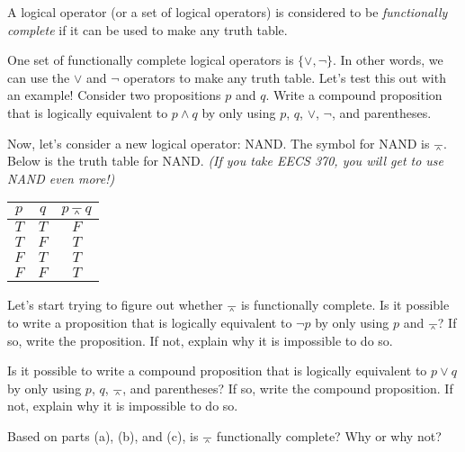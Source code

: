 \documentclass[12pt]{exam}
\begin{document}
A logical operator (or a set of logical operators) is considered to be \textit{functionally complete} if it can be used to make any truth table.
\begin{qparts}
    \item One set of functionally complete logical operators is $\{ \lor, \neg \}$. In other words, we can use the $\lor$ and $\neg$ operators to make any truth table. Let's test this out with an example! Consider two propositions $p$ and $q$. Write a compound proposition that is logically equivalent to $p \land q$ by only using $p$, $q$, $\lor$, $\neg$, and parentheses.
    \item Now, let's consider a new logical operator: NAND. The symbol for NAND is $\barwedge$. Below is the truth table for NAND. \emph{(If you take EECS 370, you will get to use NAND even more!)}
    \begin{center}
            \begin{tabular}{c c | c}
            $p$ & $q$ & $p \barwedge q$ \\
            \hline
            $T$ & $T$ & $F$\\
            $T$ & $F$ & $T$\\
            $F$ & $T$ & $T$\\
            $F$ & $F$ & $T$\\
            \end{tabular}
        \end{center}
        Let's start trying to figure out whether $\barwedge$ is functionally complete. Is it possible to write a proposition that is logically equivalent to $\neg p$ by only using $p$ and $\barwedge$? If so, write the proposition. If not, explain why it is impossible to do so.
    \item Is it possible to write a compound proposition that is logically equivalent to $p \lor q$ by only using $p$, $q$, $\barwedge$, and parentheses? If so, write the compound proposition. If not, explain why it is impossible to do so.
    \item Based on parts (a), (b), and (c), is $\barwedge$ functionally complete? Why or why not?
\end{qparts}
\end{document}
